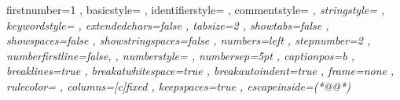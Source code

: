 {
  firstnumber=1
  , basicstyle=\lstbasicstyle
  , identifierstyle=\color{listing-identifier}
  , commentstyle=\itshape\color{listing-comment}
  , stringstyle=\color{listing-string}
  , keywordstyle=\lstkeywordstyle
  , extendedchars=false
  , tabsize=2
  , showtabs=false
  , showspaces=false
  , showstringspaces=false
  , numbers=left
  , stepnumber=2
  , numberfirstline=false,
  , numberstyle=\lstnumberstyle
  , numbersep=5pt
  , captionpos=b
  , breaklines=true
  , breakatwhitespace=true
  , breakautoindent=true
  , frame=none
  , rulecolor=\color{black}
  , columns=[c]fixed
  , keepspaces=true
 , escapeinside={(*@}{@*)}
}

